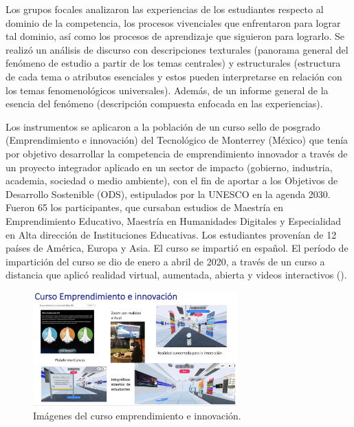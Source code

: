 \documentclass[spanish]{textolivre}
\begin{document}
Los grupos focales analizaron las experiencias de los estudiantes respecto al dominio de la competencia, los procesos vivenciales que enfrentaron para lograr tal dominio, así como los procesos de aprendizaje que siguieron para lograrlo. Se realizó un análisis de discurso con descripciones texturales (panorama general del fenómeno de estudio a partir de los temas centrales) y estructurales (estructura de cada tema o atributos esenciales y estos pueden interpretarse en relación con los temas fenomenológicos universales). Además, de un informe general de la esencia del fenómeno (descripción compuesta enfocada en las experiencias).

Los instrumentos se aplicaron a la población de un curso sello de posgrado (Emprendimiento e innovación) del Tecnológico de Monterrey (México) que tenía por objetivo desarrollar la competencia de emprendimiento innovador a través de un proyecto integrador aplicado en un sector de impacto (gobierno, industria, academia, sociedad o medio ambiente), con el fin de aportar a los Objetivos de Desarrollo Sostenible (ODS), estipulados por la UNESCO en la agenda 2030. Fueron 65 los participantes, que cursaban estudios de Maestría en Emprendimiento Educativo, Maestría en Humanidades Digitales y Especialidad en Alta dirección de Instituciones Educativas. Los estudiantes provenían de 12 países de América, Europa y Asia. El curso se impartió en español. El período de impartición del curso se dio de enero a abril de 2020, a través de un curso a distancia que aplicó realidad virtual, aumentada, abierta y videos interactivos ().

\begin{figure}[htbp]
 \centering
 \includegraphics[width=0.7\textwidth]{fig1-25716.png}
 \caption{Imágenes del curso emprendimiento e innovación.}
 \label{fig1}
\end{figure}
\end{document}
